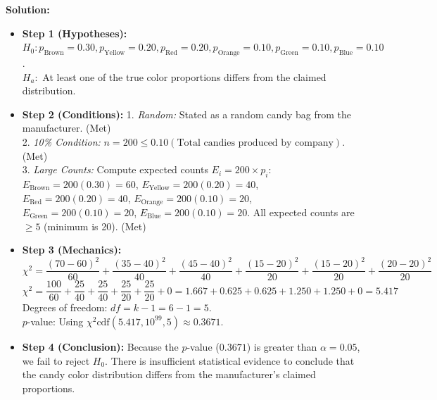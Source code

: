 \textbf{Solution:}
\begin{itemize}[leftmargin=1.2em]
  \item \textbf{Step 1 (Hypotheses):}
  $H_0: p_{\text{Brown}}=0.30, p_{\text{Yellow}}=0.20, p_{\text{Red}}=0.20, p_{\text{Orange}}=0.10, p_{\text{Green}}=0.10, p_{\text{Blue}}=0.10$.\\
  $H_a:$ At least one of the true color proportions differs from the claimed distribution.
  \item \textbf{Step 2 (Conditions):}
  1. \textit{Random:} Stated as a random candy bag from the manufacturer. (Met)\\
  2. \textit{10\% Condition:} $n = 200 \le 0.10(\text{Total candies produced by company})$. (Met)\\
  3. \textit{Large Counts:} Compute expected counts $E_i = 200 \times p_i$:
  $E_{\text{Brown}} = 200(0.30) = 60$, $E_{\text{Yellow}} = 200(0.20) = 40$, $E_{\text{Red}} = 200(0.20) = 40$,
  $E_{\text{Orange}} = 200(0.10) = 20$, $E_{\text{Green}} = 200(0.10) = 20$, $E_{\text{Blue}} = 200(0.10) = 20$.
  All expected counts are $\ge 5$ (minimum is 20). (Met)
  \item \textbf{Step 3 (Mechanics):}
  \[ \chi^2 = \frac{(70-60)^2}{60} + \frac{(35-40)^2}{40} + \frac{(45-40)^2}{40} + \frac{(15-20)^2}{20} + \frac{(15-20)^2}{20} + \frac{(20-20)^2}{20} \]
  \[ \chi^2 = \frac{100}{60} + \frac{25}{40} + \frac{25}{40} + \frac{25}{20} + \frac{25}{20} + 0 = 1.667 + 0.625 + 0.625 + 1.250 + 1.250 + 0 = 5.417 \]
  Degrees of freedom: $df = k - 1 = 6 - 1 = 5$.\\
  $p$-value: Using $\chi^2\text{cdf}(5.417, 10^{99}, 5) \approx 0.3671$.
  \item \textbf{Step 4 (Conclusion):}
  Because the $p$-value ($0.3671$) is greater than $\alpha = 0.05$, we fail to reject $H_0$. There is insufficient statistical evidence to conclude that the candy color distribution differs from the manufacturer's claimed proportions.
\end{itemize}

